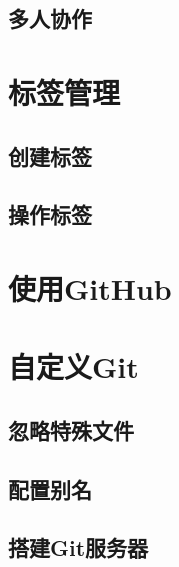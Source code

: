 \subsection{多人协作}

\section{标签管理}

\subsection{创建标签}

\subsection{操作标签}

\section{使用GitHub}

\section{自定义Git}

\subsection{忽略特殊文件}

\subsection{配置别名}

\subsection{搭建Git服务器}

